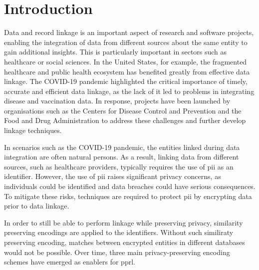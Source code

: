 
\chapter{Introduction}  \label{sec:introduction}
Data and record linkage is an important aspect of research and software projects, enabling the integration of data from different sources about the same entity to gain additional insights.
This is particularly important in sectors such as healthcare or social sciences.
In the United States, for example, the fragmented healthcare and public health ecosystem has benefited greatly from effective data linkage.
The COVID-19 pandemic highlighted the critical importance of timely, accurate and efficient data linkage, as the lack of it led to problems in integrating disease and vaccination data.
In response, projects have been launched by organisations such as the Centers for Disease Control and Prevention and the Food and Drug Administration to address these challenges and further develop linkage techniques. \cite{vidanage2020graph}

In scenarios such as the COVID-19 pandemic, the entities linked during data integration are often natural persons.
As a result, linking data from different sources, such as healthcare providers, typically requires the use of \ac{pii} as an identifier.
However, the use of \ac{pii} raises significant privacy concerns, as individuals could be identified and data breaches could have serious consequences.
To mitigate these risks, techniques are required to protect \ac{pii} by encrypting data prior to data linkage. \cite{vidanage2020graph}

In order to still be able to perform linkage while preserving privacy, similarity preserving encodings are applied to the identifiers.
Without such similiraty preserving encoding, matches between encrypted entities in different databases would not be possible.
Over time, three main privacy-preserving encoding schemes have emerged as enablers for \ac{pprl}. \cite{vidanage2020graph, schaefer2024}

